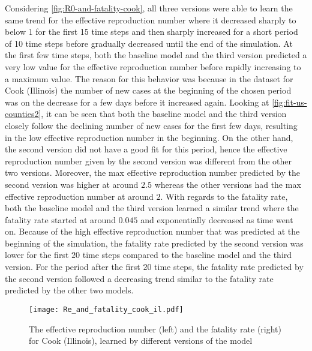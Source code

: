 Considering \autoref{fig:R0-and-fatality-cook}, all three versions were able to learn the same trend for the effective reproduction number where it decreased sharply to below $1$ for the first 15 time steps and then sharply increased for a short period of 10 time steps before gradually decreased until the end of the simulation.
At the first few time steps, both the baseline model and the third version predicted a very low value for the effective reproduction number before rapidly increasing to a maximum value.
The reason for this behavior was because in the dataset for Cook (Illinois) the number of new cases at the beginning of the chosen period was on the decrease for a few days before it increased again.
Looking at \autoref{fig:fit-us-counties2}, it can be seen that both the baseline model and the third version closely follow the declining number of new cases for the first few days, resulting in the low effective reproduction number in the beginning.
On the other hand, the second version did not have a good fit for this period, hence the effective reproduction number given by the second version was different from the other two versions.
Moreover, the max effective reproduction number predicted by the second version was higher at around $2.5$ whereas the other versions had the max effective reproduction number at around $2$.
With regards to the fatality rate, both the baseline model and the third version learned a similar trend where the fatality rate started at around $0.045$ and exponentially decreased as time went on.
Because of the high effective reproduction number that was predicted at the beginning of the simulation, the fatality rate predicted by the second version was lower for the first $20$ time steps compared to the baseline model and the third version.
For the period after the first $20$ time steps, the fatality rate predicted by the second version followed a decreasing trend similar to the fatality rate predicted by the other two models.

\begin{figure}[!htb]
    \centering
    \texttt{[image: Re\_and\_fatality\_cook\_il.pdf]}
    \caption[Learnt effective reproduction number and fatality rate for Cook (Illinois)]{The effective reproduction number (left) and the fatality rate (right) for Cook (Illinois), learned by different versions of the model}
    \label{fig:R0-and-fatality-cook}
\end{figure}

